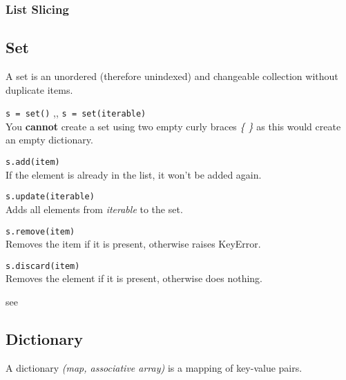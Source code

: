         \subsubsection{List Slicing} \label{List Slicing}

    \subsection{Set}
        A set is an unordered (therefore unindexed) and  changeable collection without duplicate
        items.

        \begin{itemize}
         \texttt{s = set()} \sep{,}
        \texttt{s = set(iterable)} \\
        You \textbf{cannot} create a set using two empty curly braces \textit{\{ \}} as this would
        create an empty dictionary.

         \texttt{s.add(item)} \\
        If the element is already in the list, it won't be added again.

         \texttt{s.update(iterable)} \\
        Adds all elements from \textit{iterable} to the set.

         \texttt{s.remove(item)} \\
        Removes the item if it is present, otherwise raises KeyError.

         \texttt{s.discard(item)} \\
        Removes the element if it is present, otherwise does nothing.

         see 
        \end{itemize}

    \subsection{Dictionary}
        A dictionary \textit{(map, associative array)} is a mapping of key-value pairs.

